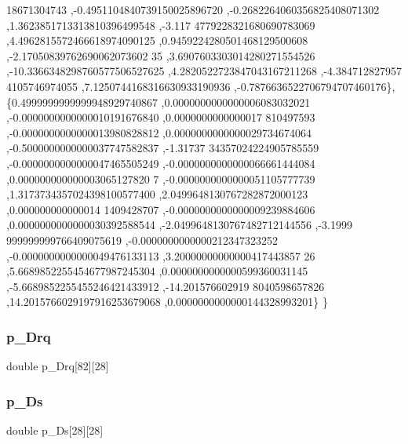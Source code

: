 \begin{DoxyCode}
      18671304743 ,-0.4951104840739150025896720 ,-0.2682264060356825408071302 ,1.3623851713313810396499548 ,-3.117
      4779228321680690783069 ,4.4962815572466618974090125 ,0.9459224280501468129500608 ,-2.17050839762690062073602
      35 ,3.6907603303014280271554526 ,-10.3366348298760577506527625 ,4.2820522723847043167211268 ,-4.384712827957
      4105746974055 ,7.1250744168316630933190936 ,-0.7876636522706794707460176\},
\{0.4999999999999948929740867 ,0.0000000000000006083032021 ,-0.0000000000000010191676840 ,0.0000000000000017
      810497593 ,-0.0000000000000013980828812 ,0.0000000000000029734674064 ,-0.5000000000000037747582837 ,-1.31737
      34357024224905785559 ,-0.0000000000000047465505249 ,-0.0000000000000066661444084 ,0.000000000000003065127820
      7 ,-0.0000000000000051105777739 ,1.3173734357024398100577400 ,2.0499648130767282872000123 ,0.000000000000014
      1409428707 ,-0.0000000000000009239884606 ,0.0000000000000030392588544 ,-2.0499648130767482712144556 ,-3.1999
      999999999766409075619 ,-0.0000000000000212347323252 ,-0.0000000000000049476133113 ,3.20000000000000417443857
      26 ,5.6689852255454677987245304 ,0.0000000000000599360031145 ,-5.6689852255455246421433912 ,-14.201576602919
      8040598657826 ,14.2015766029197916253679068 ,0.0000000000000144328993201\}
\}
\end{DoxyCode}
\mbox{\label{a00461_afa39833b29634476058b54575381a1dc}} 
\subsubsection{\texorpdfstring{p\+\_\+\+Drq}{p\_Drq}}
{\footnotesize\ttfamily double p\+\_\+\+Drq\mbox{[}82\mbox{]}\mbox{[}28\mbox{]}}

\mbox{\label{a00461_a12faa16cf926b3799b733b5da2993946}} 
\subsubsection{\texorpdfstring{p\+\_\+\+Ds}{p\_Ds}}
{\footnotesize\ttfamily double p\+\_\+\+Ds\mbox{[}28\mbox{]}\mbox{[}28\mbox{]}}

